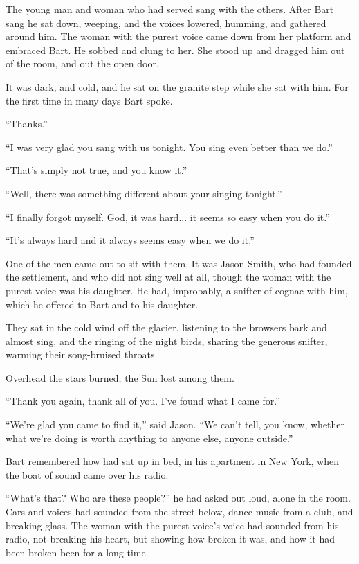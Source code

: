 \documentclass[english,11pt,letterpaper,onecolumn]{scrbook}
\begin{document}
	The young man and woman who had served sang with the others. After Bart sang he sat down, weeping, and the voices lowered, humming, and gathered around him. The woman with the purest voice came down from her platform and embraced Bart. He sobbed and clung to her. She stood up and dragged him out of the room, and out the open door. 

	It was dark, and cold, and he sat on the granite step while she sat with him. For the first time in many days Bart spoke.

	``Thanks.''

	``I was very glad you sang with us tonight. You sing even better than we do.''

	``That's simply not true, and you know it.''

	``Well, there was something different about your singing tonight.''

	``I finally forgot myself. God, it was hard... it seems so easy when you do it.''

	``It's always hard and it always seems easy when we do it.''

	One of the men came out to sit with them. It was Jason Smith, who had founded the settlement, and who did not sing well at all, though the woman with the purest voice was his daughter. He had, improbably, a snifter of cognac with him, which he offered to Bart and to his daughter.

	They sat in the cold wind off the glacier, listening to the browsers bark and almost sing, and the ringing of the night birds, sharing the generous snifter, warming their song-bruised throats.

	Overhead the stars burned, the Sun lost among them.

	``Thank you again, thank all of you. I've found what I came for.''

	``We're glad you came to find it,'' said Jason. ``We can't tell, you know, whether what we're doing is worth anything to anyone else, anyone outside.''

	Bart remembered how had sat up in bed, in his apartment in New York, when the boat of sound came over his radio.

	``What's that? Who are these people?'' he had asked out loud, alone in the room. Cars and voices had sounded from the street below, dance music from a club, and breaking glass.  The woman with the purest voice's voice had sounded from his radio, not breaking his heart, but showing how broken it was, and how it had been broken been for a long time.
\end{document}
